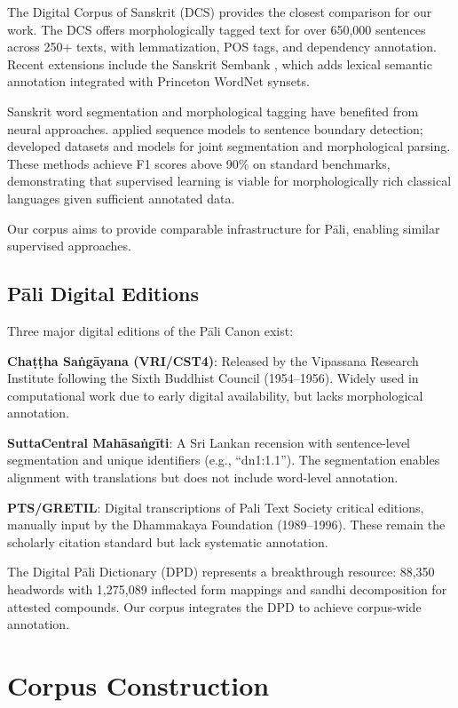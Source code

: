 \documentclass[11pt,twocolumn]{article}
\begin{document}
The Digital Corpus of Sanskrit (DCS) \citep{hellwig2010} provides the closest comparison for our work. The DCS offers morphologically tagged text for over 650,000 sentences across 250+ texts, with lemmatization, POS tags, and dependency annotation. Recent extensions include the Sanskrit Sembank \citep{sembank2025}, which adds lexical semantic annotation integrated with Princeton WordNet synsets.

Sanskrit word segmentation and morphological tagging have benefited from neural approaches. \citet{hellwig2016} applied sequence models to sentence boundary detection; \citet{krishna2018} developed datasets and models for joint segmentation and morphological parsing. These methods achieve F1 scores above 90\% on standard benchmarks, demonstrating that supervised learning is viable for morphologically rich classical languages given sufficient annotated data.

Our corpus aims to provide comparable infrastructure for Pāli, enabling similar supervised approaches.

\subsection{Pāli Digital Editions}

Three major digital editions of the Pāli Canon exist:

\textbf{Chaṭṭha Saṅgāyana (VRI/CST4)}: Released by the Vipassana Research Institute following the Sixth Buddhist Council (1954--1956). Widely used in computational work due to early digital availability, but lacks morphological annotation.

\textbf{SuttaCentral Mahāsaṅgīti}: A Sri Lankan recension with sentence-level segmentation and unique identifiers (e.g., ``dn1:1.1''). The segmentation enables alignment with translations but does not include word-level annotation.

\textbf{PTS/GRETIL}: Digital transcriptions of Pali Text Society critical editions, manually input by the Dhammakaya Foundation (1989--1996). These remain the scholarly citation standard but lack systematic annotation.

The Digital Pāli Dictionary (DPD) \citep{dpd2026} represents a breakthrough resource: 88,350 headwords with 1,275,089 inflected form mappings and sandhi decomposition for attested compounds. Our corpus integrates the DPD to achieve corpus-wide annotation.

\section{Corpus Construction}
\label{sec:method}
\end{document}
